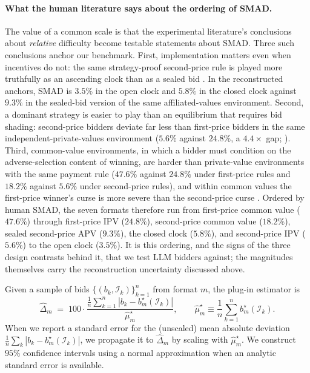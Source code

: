 \documentclass{article} %
\newif\ifmarkrev
\newcommand{\rev}[1]{\ifmarkrev\begingroup\color{red}#1\endgroup\else#1\fi}
\begin{document}
\paragraph{\rev{What the human literature says about the ordering of SMAD.}}
\rev{The value of a common scale is that the experimental literature's conclusions about \emph{relative} difficulty become testable statements about SMAD. Three such conclusions anchor our benchmark. First, implementation matters even when incentives do not: the same strategy-proof second-price rule is played more truthfully as an ascending clock than as a sealed bid \citep{li2017obviously, breitmoser2022obviousness}. In the reconstructed anchors, SMAD is $3.5\%$ in the open clock and $5.8\%$ in the closed clock against $9.3\%$ in the sealed-bid version of the same affiliated-values environment. Second, a dominant strategy is easier to play than an equilibrium that requires bid shading: second-price bidders deviate far less than first-price bidders in the same independent-private-values environment ($5.6\%$ against $24.8\%$, a $4.4\times$ gap; \citealp{kagel1993independent}). Third, common-value environments, in which a bidder must condition on the adverse-selection content of winning, are harder than private-value environments with the same payment rule ($47.6\%$ against $24.8\%$ under first-price rules and $18.2\%$ against $5.6\%$ under second-price rules), and within common values the first-price winner's curse is more severe than the second-price curse \citep{kagel1986winner, levin1996revenue}. Ordered by human SMAD, the seven formats therefore run from first-price common value ($47.6\%$) through first-price IPV ($24.8\%$), second-price common value ($18.2\%$), sealed second-price APV ($9.3\%$), the closed clock ($5.8\%$), and second-price IPV ($5.6\%$) to the open clock ($3.5\%$). It is this ordering, and the signs of the three design contrasts behind it, that we test LLM bidders against; the magnitudes themselves carry the reconstruction uncertainty discussed above.}


Given a sample of bids $\{(b_k,\mathcal I_k)\}_{k=1}^n$ from format $m$, the plug-in estimator is
\[
\widehat{\Delta}_m
\;=\;
100 \cdot
\frac{\frac{1}{n}\sum_{k=1}^{n}\left|b_k-b_m^\star(\mathcal I_k)\right|}
{\widehat{\mu}_m^\star},
\qquad
\widehat{\mu}_m^\star \equiv \frac{1}{n}\sum_{k=1}^{n} b_m^\star(\mathcal I_k).
\]
When we report a standard error for the (unscaled) mean absolute deviation $\frac{1}{n}\sum_k |b_k-b_m^\star(\mathcal I_k)|$, we propagate it to $\widehat{\Delta}_m$ by scaling with $\widehat{\mu}_m^\star$. We construct $95\%$ confidence intervals using a normal approximation when an analytic standard error is available.
\end{document}
